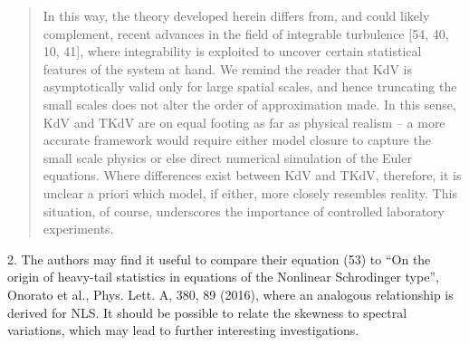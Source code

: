 \documentclass[11pt]{article}
\newcommand{\comment}[1]{{\color{blue} #1}}
\begin{document}
\begin{itemize}
\begin{quotation}
In this way, the theory developed herein differs from, and could likely complement, recent
advances in the field of integrable turbulence [54, 40, 10, 41], where integrability is exploited to uncover certain statistical features of the system at hand. We remind the reader that KdV is asymptotically valid only for large spatial scales, and hence truncating the small scales does not alter the order of approximation made. In this sense, KdV and TKdV are on equal footing as far as physical realism – a more accurate framework would require either model closure to capture the small scale physics or else direct numerical simulation of the Euler equations. Where differences exist between KdV and TKdV, therefore, it is unclear a priori which model, if either, more closely resembles reality. This situation, of course, underscores the importance of controlled laboratory experiments.
\end{quotation}
\end{itemize}


\noindent
\comment{
2. The authors may find it useful to compare their equation (53) to
 ``On the origin of heavy-tail statistics in equations of the Nonlinear Schrodinger type'', Onorato et al., Phys. Lett. A, 380, 89 (2016), where an analogous relationship is derived for NLS. It should be possible to relate the skewness to spectral variations, which may lead to further interesting investigations.
}
\end{document}
